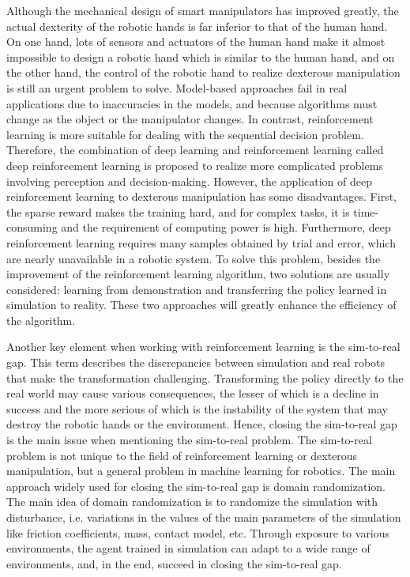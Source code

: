 \documentclass[a4paper]{article}
\begin{document}
Although the mechanical design of smart manipulators has improved greatly, the actual dexterity of the robotic hands is far inferior to that of the human hand. On one hand, lots of sensors and actuators of the human hand make it almost impossible to design a robotic hand which is similar to the human hand, and on the other hand, the control of the robotic hand to realize dexterous manipulation is still an urgent problem to solve. Model-based approaches fail in real applications due to inaccuracies in the models, and because algorithms must change as the object or the manipulator changes. In contrast, reinforcement learning is more suitable for dealing with the sequential decision problem.
Therefore, the combination of deep learning and reinforcement learning called deep reinforcement learning is proposed to realize more complicated problems involving perception and decision-making. However, the application of deep reinforcement learning to dexterous manipulation has some disadvantages. First, the sparse reward makes the training hard, and for complex tasks, it is time-consuming and the requirement of computing power is high. Furthermore, deep reinforcement learning requires many samples obtained by trial and error, which are nearly unavailable in a robotic system. To solve this problem, besides the improvement of the reinforcement learning algorithm, two solutions are usually considered: learning from demonstration and transferring the policy learned in simulation to reality. These two approaches will greatly enhance the efficiency of the algorithm.

Another key element when working with reinforcement learning is the sim-to-real gap. This term describes the discrepancies between simulation and real robots that make the transformation challenging. Transforming the policy directly to the real world may cause various consequences, the lesser of which is a decline in success and the more serious of which is the instability of the system that may destroy the robotic hands or the environment. Hence, closing the sim-to-real gap is the main issue when mentioning the sim-to-real problem. The sim-to-real problem is not unique to the field of reinforcement learning or dexterous manipulation, but a general problem in machine learning for robotics. The main approach widely used for closing the sim-to-real gap is domain randomization. The main idea of domain randomization is to randomize the simulation with disturbance, i.e. variations in the values of the main parameters of the simulation like friction coefficients, mass, contact model, etc. Through exposure to various environments, the agent trained in simulation can adapt to a wide range of environments, and, in the end, succeed in closing the sim-to-real gap.
\end{document}
